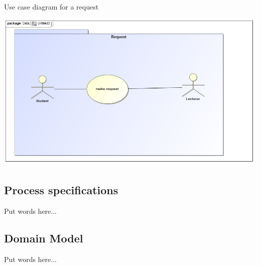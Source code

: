\documentclass[12pt, oneside]{article}
\begin{document}
		Use case diagram for a request
		
			 \includegraphics[scale=1]{request1}
			 
	\subsection{Process specifications}
		Put words here...
	\subsection{ Domain Model}
		Put words here...
\end{document}
